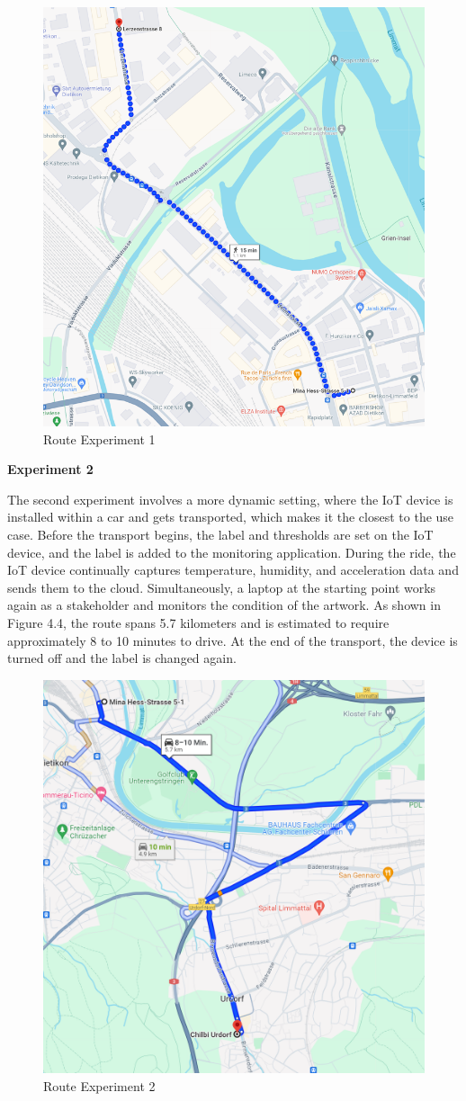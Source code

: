 \begin{figure}[H]
    \centering
    \includegraphics[width=0.4\linewidth]{Experiment_1_Route.png}
    \caption{Route Experiment 1}
    \label{fig:Route Experiment 1}
\end{figure}

\textbf{Experiment 2}

The second experiment involves a more dynamic setting, where the IoT device is installed within a car and gets transported, which makes it the closest to the use case. Before the transport begins, the label and thresholds are set on the IoT device, and the label is added to the monitoring application. During the ride, the IoT device continually captures temperature, humidity, and acceleration data and sends them to the cloud. Simultaneously, a laptop at the starting point works again as a stakeholder and monitors the condition of the artwork. As shown in Figure 4.4, the route spans 5.7 kilometers and is estimated to require approximately 8 to 10 minutes to drive. At the end of the transport, the device is turned off and the label is changed again.

\begin{figure}[H]
    \centering
    \includegraphics[width=0.5\linewidth]{Experiment_2_Route.png}
    \caption{Route Experiment 2}
    \label{fig:Route Experiment 2}
\end{figure}

